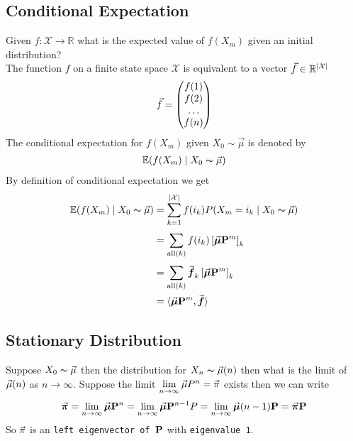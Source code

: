 \documentclass[12pt,a4paper]{article}
\begin{document}
\subsection{Conditional Expectation}
Given $f: \mathcal{X}\to \mathbb{R}$ what is the expected value of $f(X_m)$ given an initial distribution? 
\\
The function $f$ on a finite state space $\mathcal{X}$ is equivalent to a vector $\vec{f} \in \mathbb{R}^{\abs{\mathcal{X}}}$
\begin{align*}
\vec{f} = \mqty(f(1)\\f(2)\\ \ldots \\ f(n))
\end{align*}  
The conditional expectation for $f(X_m)$ given $X_0 \sim \vec{\mu}$ is denoted by 
\begin{align*}
\mathbb{E}(f(X_m) \;\vert\; X_0 \thicksim \vec{\mu})
\end{align*} 
By definition of conditional expectation we get
\begin{align*}
\mathbb{E}(f(X_m) \;\vert\; X_0 \thicksim \vec{\mu}) &= \sum\limits_{k=1}^{\abs{\mathcal{X}}} f(i_k)P(X_m = i_k \;\vert\; X_0 \thicksim \vec{\mu})\\
&= \sum\limits_{\mathrm{all}(k)}^{} f(i_k) \left[\va*{\mu} \vb{P}^m \right]_k\\
&= \sum\limits_{\mathrm{all}(k)}^{} \va*{f}_k \left[\va*{\mu} \vb{P}^m \right]_k\\
&= \langle\va*{\mu}\vb{P}^m, \va*{f}\rangle
\end{align*}
\newpage
\subsection{Stationary Distribution}
Suppose $X_0 \thicksim \va{\mu}$ then the distribution for $X_n \thicksim \va\mu(n)$ then what is the limit of $\va\mu(n)$ as $n\to \infty$. 
Suppose the limit $\lim\limits_{n \rightarrow \infty}\va\mu P^n = \va\pi$ exists then we can write 
\begin{align*}
\va*{\pi} = \lim\limits_{n \rightarrow \infty}\va*{\mu}\vb{P}^n = \lim\limits_{n \rightarrow \infty}\va*{\mu}\vb{P}^{n-1}P = \lim\limits_{n \rightarrow \infty} \va*{\mu}(n-1)\vb{P} = \va*{\pi}\vb{P}
\end{align*}
So $\va\pi$ is an \texttt{left eigenvector of $\vb{P}$} with \texttt{eigenvalue 1}. 
\end{document}
